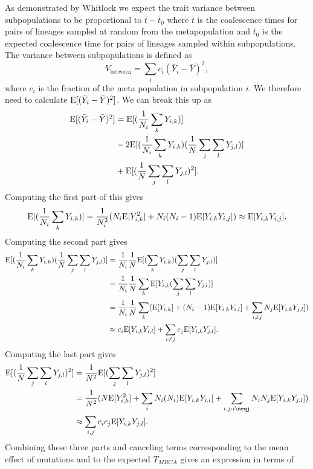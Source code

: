 As demonstrated by Whitlock we expect the trait variance between subpopulations
to be proportional to $\bar{t} - \bar{t}_0$ where $\bar{t}$ is the coalescence
times for pairs of lineages sampled at random from the metapopulation and
$\bar{t}_0$ is the expected coalescence time for pairs of lineages sampled
within subpopulations. The variance between subpopulations is defined as
\begin{equation}
  V_{\text{between}} = \sum_i c_i (\bar{Y}_i - \bar{Y})^2,
\end{equation}
where $c_i$ is the fraction of the meta population in subpopulation $i$. We
therefore need to calculate $\mathrm{E}[(\bar{Y}_i - \bar{Y})^2]$. We can break this up as
\begin{align}
  \mathrm{E}[(\bar{Y}_i - \bar{Y})^2] &= \mathrm{E}[(\frac{1}{N_i}\sum_k Y_{i,k})] \\
  &- 2\mathrm{E}[(\frac{1}{N_i}\sum_k Y_{i,k})(\frac{1}{N}\sum_j\sum_lY_{j,l})] \\
  &+ \mathrm{E}[(\frac{1}{N}\sum_j\sum_lY_{j,l})^2].
\end{align}
Computing the first part of this gives
\begin{equation}
  \mathrm{E}[(\frac{1}{N_i}\sum_k Y_{i,k})] = \frac{1}{N_i^2}(N_i\mathrm{E}[Y_{i,k}^2] + N_i(N_i-1)\mathrm{E}[Y_{i,k}Y_{i,j}])
  \approx \mathrm{E}[Y_{i,k}Y_{i,j}].
\end{equation}
Computing the second part gives
\begin{align}
  \mathrm{E}[(\frac{1}{N_i}\sum_k Y_{i,k})(\frac{1}{N}\sum_j\sum_lY_{j,l})] &=
  \frac{1}{N_i}\frac{1}{N}\mathrm{E}[(\sum_k Y_{i,k})(\sum_j\sum_lY_{j,l})] \\
  &= \frac{1}{N_i}\frac{1}{N}\sum_k\mathrm{E}[Y_{i,k}(\sum_j\sum_lY_{j,l})] \\
  &= \frac{1}{N_i}\frac{1}{N}\sum_k(\mathrm{E}[Y_{i,k}] + (N_i-1)\mathrm{E}[Y_{i,k}Y_{i,l}] +
  \sum_{i\neq j} N_j \mathrm{E}[Y_{i,k}Y_{j,l}]) \\
  &\approx c_i \mathrm{E}[Y_{i,k}Y_{i,l}] + \sum_{i\neq j} c_j \mathrm{E}[Y_{i,k}Y_{j,l}].
\end{align}
Computing the last part gives
\begin{align}
  \E[(\frac{1}{N}\sum_j\sum_lY_{j,l})^2] &= \frac{1}{N^2}\E[(\sum_j\sum_lY_{j,l})^2] \\
  &= \frac{1}{N^2}(N\E[Y_{i,k}^2] + \sum_iN_i(N_i)\E[Y_{i,k}Y_{i,l}] +
  \sum_{i,j:i\neqj} N_iN_j \E[Y_{i,k}Y_{j,l}]) \\
  &\approx \sum_{i,j} c_ic_j \E[Y_{i,k}Y_{j,l}].
\end{align}
Combining these three parts and canceling terms corresponding to the mean effect
of mutations and to the expected $T_{MRCA}$ gives an expression in terms of
